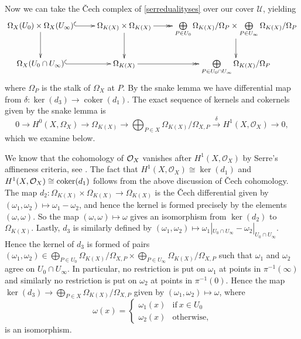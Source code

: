 \documentclass[draft, 11pt]{article} %
\theoremstyle{plain}
\theoremstyle{remark}
\newcommand{\cO}{{\cal O}}
\newcommand{\ra}{\rightarrow}
\newcommand{\cU}{{\mathcal U}}
\newcommand{\cech}{\v{C}ech }
\newcommand{\hzero}{{H^0(X,\Omega_X)}}
\newcommand{\hone}{H^1(X,\mathcal{O}_X)}
\begin{document}
Now we can take the \cech complex of \eqref{serredualityses} over our cover $\cU$, yielding
\begin{displaymath}
\xymatrix{\Omega_X(U_0)\times\Omega_X(U_\infty) \ar@{^{(}->}[r] \ar[d] & \Omega_{K(X)} \times \Omega_{K(X)} \ar[d] \ar@{->>}[r] & \bigoplus \limits_{P \in U_0} \Omega_{K(X)}/\Omega_P \times \bigoplus \limits_{P \in U_\infty} \Omega_{K(X)}/\Omega_P \ar[d] \\
\Omega_X(U_0 \cap U_\infty)\ar@{^{(}->}[r]  & \Omega_{K(X)} \ar@{->>}[r] & \bigoplus \limits_{P\in U_0 \cap U_\infty} \Omega_{K(X)}/\Omega_P }
\end{displaymath}
where $\Omega_P$ is the stalk of $\Omega_X$ at $P$.
By the snake lemma we have differential map from $\delta \colon \ker (d_3) \rightarrow \operatorname {coker}(d_1)$.
The exact sequence of kernels and cokernels given by the snake lemma is
\[
0 \rightarrow \hzero \ra \Omega_{K(X)} \ra \bigoplus_{P \in X}\Omega_{K(X)}/\Omega_{X,P} \xrightarrow{\delta} \hone \ra 0,
\]
which we examine below.

We know that the cohomology of $\cO_X$ vanishes after $\hone$ by Serre's affineness criteria, see \cite[Thm 5.2.23]{liu}.
The fact that $\hone \cong \ker(d_1)$ and $\hone \cong {\rm coker}(d_1)$ follows from the above discussion of \cech cohomology.
The map $d_2\colon \Omega_{K(X)} \times \Omega_{K(X)} \ra \Omega_{K(X)}$ is the \cech differential given by $(\omega_1,\omega_2) \mapsto \omega_1 - \omega_2$, and hence the kernel is formed precisely by the elements $(\omega, \omega)$.
So the map $(\omega, \omega) \mapsto \omega$ gives an isomorphism from $\ker(d_2)$ to $\Omega_{K(X)}$.
Lastly, $d_3$ is similarly defined by $(\omega_1, \omega_2) \mapsto \omega_1|_{U_0 \cap U_\infty} - \omega_2|_{U_0 \cap U_\infty}$.
Hence the kernel of $d_3$ is formed of pairs $(\omega_1, \omega_2) \in \bigoplus_{P \in U_0} \Omega_{K(X)}/\Omega_{X,P} \times \bigoplus_{P \in  U_\infty} \Omega_{K(X)}/\Omega_{X,P}$ such that $\omega_1$ and $\omega_2$ agree on $U_0 \cap U_\infty$.
In particular, no restriction is put on $\omega_1$ at points in $\pi^{-1}(\infty)$ and similarly no restriction is put on $\omega_2$ at points in $\pi^{-1}(0)$.
Hence the map $\ker(d_3) \ra \bigoplus_{P \in X} \Omega_{K(X)}/\Omega_{X,P}$ given by $(\omega_1, \omega_2) \mapsto \omega$, where 
\begin{equation}
\omega(x) = \begin{cases}
\omega_1(x) & \text{if}\ x \in U_0 \\
\omega_2(x) & \text{otherwise},
\end{cases}
\end{equation}
is an isomorphism.
\end{document}

